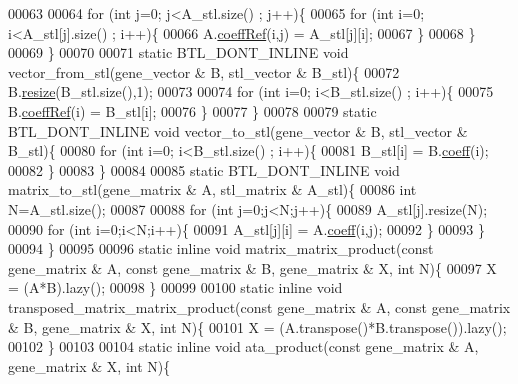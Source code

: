 \begin{DoxyCode}
00063 
00064     \textcolor{keywordflow}{for} (\textcolor{keywordtype}{int} j=0; j<A\_stl.size() ; j++)\{
00065       \textcolor{keywordflow}{for} (\textcolor{keywordtype}{int} i=0; i<A\_stl[j].size() ; i++)\{
00066         A.\hyperlink{class_eigen_1_1_plain_object_base_a25626a55b26a4323565f79d1b7c48ea8}{coeffRef}(i,j) = A\_stl[j][i];
00067       \}
00068     \}
00069   \}
00070 
00071   \textcolor{keyword}{static} BTL\_DONT\_INLINE  \textcolor{keywordtype}{void} vector\_from\_stl(gene\_vector & B, stl\_vector & B\_stl)\{
00072     B.\hyperlink{class_eigen_1_1_plain_object_base_a99d9054ee2d5a40c6e00ded0265e9cea}{resize}(B\_stl.size(),1);
00073 
00074     \textcolor{keywordflow}{for} (\textcolor{keywordtype}{int} i=0; i<B\_stl.size() ; i++)\{
00075       B.\hyperlink{class_eigen_1_1_plain_object_base_a25626a55b26a4323565f79d1b7c48ea8}{coeffRef}(i) = B\_stl[i];
00076     \}
00077   \}
00078 
00079   \textcolor{keyword}{static} BTL\_DONT\_INLINE  \textcolor{keywordtype}{void} vector\_to\_stl(gene\_vector & B, stl\_vector & B\_stl)\{
00080     \textcolor{keywordflow}{for} (\textcolor{keywordtype}{int} i=0; i<B\_stl.size() ; i++)\{
00081       B\_stl[i] = B.\hyperlink{class_eigen_1_1_plain_object_base_afbfc12954f16d21aedb7bd839f64a278}{coeff}(i);
00082     \}
00083   \}
00084 
00085   \textcolor{keyword}{static} BTL\_DONT\_INLINE  \textcolor{keywordtype}{void} matrix\_to\_stl(gene\_matrix & A, stl\_matrix & A\_stl)\{
00086     \textcolor{keywordtype}{int} N=A\_stl.size();
00087 
00088     \textcolor{keywordflow}{for} (\textcolor{keywordtype}{int} j=0;j<N;j++)\{
00089       A\_stl[j].resize(N);
00090       \textcolor{keywordflow}{for} (\textcolor{keywordtype}{int} i=0;i<N;i++)\{
00091         A\_stl[j][i] = A.\hyperlink{class_eigen_1_1_plain_object_base_afbfc12954f16d21aedb7bd839f64a278}{coeff}(i,j);
00092       \}
00093     \}
00094   \}
00095 
00096   \textcolor{keyword}{static} \textcolor{keyword}{inline} \textcolor{keywordtype}{void} matrix\_matrix\_product(\textcolor{keyword}{const} gene\_matrix & A, \textcolor{keyword}{const} gene\_matrix & B, gene\_matrix & X, \textcolor{keywordtype}{
      int} N)\{
00097     X = (A*B).lazy();
00098   \}
00099 
00100   \textcolor{keyword}{static} \textcolor{keyword}{inline} \textcolor{keywordtype}{void} transposed\_matrix\_matrix\_product(\textcolor{keyword}{const} gene\_matrix & A, \textcolor{keyword}{const} gene\_matrix & B, 
      gene\_matrix & X, \textcolor{keywordtype}{int} N)\{
00101     X = (A.transpose()*B.transpose()).lazy();
00102   \}
00103 
00104   \textcolor{keyword}{static} \textcolor{keyword}{inline} \textcolor{keywordtype}{void} ata\_product(\textcolor{keyword}{const} gene\_matrix & A, gene\_matrix & X, \textcolor{keywordtype}{int} N)\{

\end{DoxyCode}
